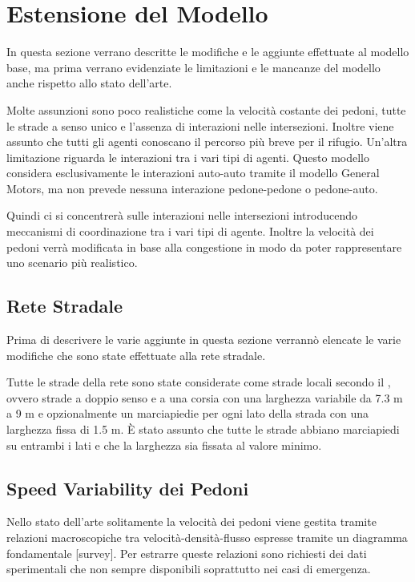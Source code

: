 \section{Estensione del Modello}
\label{sec:estensione}
In questa sezione verrano descritte le modifiche e le aggiunte effettuate al modello base,
ma prima verrano evidenziate le limitazioni e le mancanze del modello anche rispetto allo stato dell'arte.

Molte assunzioni sono poco realistiche come la velocità costante dei pedoni, tutte le strade a senso unico e l'assenza di interazioni nelle
intersezioni.
%
Inoltre viene assunto che tutti gli agenti conoscano il percorso più breve per il rifugio.
%
Un'altra limitazione riguarda le interazioni tra i vari tipi di agenti.
Questo modello considera esclusivamente le interazioni auto-auto
tramite il modello General Motors, ma non prevede nessuna interazione pedone-pedone o pedone-auto.

Quindi ci si concentrerà sulle interazioni nelle intersezioni introducendo meccanismi di coordinazione tra i vari tipi di agente.
Inoltre la velocità dei pedoni verrà modificata in base alla congestione in modo da poter rappresentare uno scenario più realistico.

\subsection{Rete Stradale}
Prima di descrivere le varie aggiunte in questa sezione verrannò elencate le varie modifiche che sono state effettuate alla rete stradale.

Tutte le strade della rete sono state considerate come strade locali secondo il \textcite{seaside2010tsp},
ovvero strade a doppio senso e a una corsia con una larghezza variabile da 7.3 m a 9 m e opzionalmente
un marciapiedie per ogni lato della strada con una larghezza fissa di 1.5 m.
%
È stato assunto che tutte le strade abbiano marciapiedi su entrambi i lati e che la larghezza sia fissata al valore minimo.

\newpage
\subsection{Speed Variability dei Pedoni}
Nello stato dell'arte solitamente la velocità dei pedoni viene gestita tramite relazioni macroscopiche tra velocità-densità-flusso
espresse tramite un diagramma fondamentale [survey].
Per estrarre queste relazioni sono richiesti dei dati sperimentali che non sempre disponibili soprattutto nei casi di emergenza.


